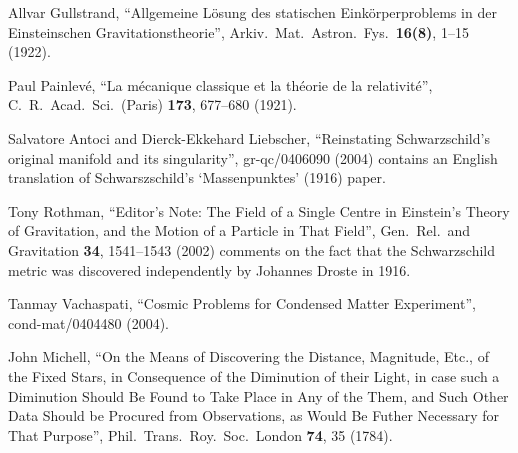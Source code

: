 \documentclass[twocolumn,showpacs,preprintnumbers,amsmath,amssymb,prb]{revtex4}
\begin{document}
\begin{thebibliography}{}


Allvar Gullstrand,
``Allgemeine L\"osung des statischen Eink\"orperproblems in der
Einsteinschen Gravitationstheorie'',
Arkiv.\ Mat.\ Astron.\ Fys.\ \textbf{16(8)}, 1--15 (1922).

Paul Painlev\'e,
``La m\'ecanique classique et la th\'eorie de la relativit\'e'',
C.\ R.\ Acad.\ Sci.\ (Paris) \textbf{173}, 677--680 (1921).

Salvatore Antoci and Dierck-Ekkehard Liebscher,
``Reinstating Schwarzschild's original manifold and its singularity'',
gr-qc/0406090 (2004)
contains an English translation of
Schwarszschild's `Massenpunktes' (1916) paper.

Tony Rothman,
``Editor's Note: The Field of a Single Centre in Einstein's Theory of Gravitation, and the Motion of a Particle in That Field'',
Gen.\ Rel.\ and Gravitation \textbf{34}, 1541--1543 (2002)
comments on the fact that the Schwarzschild metric
was discovered independently by Johannes Droste in 1916.

Tanmay Vachaspati,
``Cosmic Problems for Condensed Matter Experiment'',
cond-mat/0404480 (2004).

John Michell,
``On the Means of Discovering the Distance, Magnitude, Etc.,
of the Fixed Stars, in Consequence of the Diminution of their Light,
in case such a Diminution Should Be Found to Take Place in Any of the Them,
and Such Other Data Should be Procured from Observations,
as Would Be Futher Necessary for That Purpose'',
Phil.\ Trans.\ Roy.\ Soc.\ London \textbf{74}, 35 (1784).


\end{thebibliography}
\end{document}
